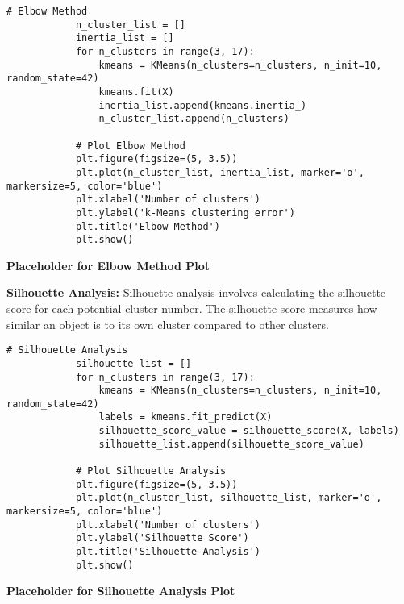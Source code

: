         \begin{lstlisting}[caption={Elbow Method for k-Means Clustering}, label={lst:elbow_method}]
            # Elbow Method
            n_cluster_list = []
            inertia_list = []
            for n_clusters in range(3, 17):
                kmeans = KMeans(n_clusters=n_clusters, n_init=10, random_state=42)
                kmeans.fit(X)
                inertia_list.append(kmeans.inertia_)
                n_cluster_list.append(n_clusters)
            
            # Plot Elbow Method
            plt.figure(figsize=(5, 3.5))
            plt.plot(n_cluster_list, inertia_list, marker='o', markersize=5, color='blue')
            plt.xlabel('Number of clusters')
            plt.ylabel('k-Means clustering error')
            plt.title('Elbow Method')
            plt.show()
        \end{lstlisting}

        \textbf{Placeholder for Elbow Method Plot}

        \textbf{Silhouette Analysis:} Silhouette analysis involves calculating the silhouette score for each potential cluster number. The silhouette score measures how similar an object is to its own cluster compared to other clusters.
        
        \vspace{0.5em}

        \begin{lstlisting}[caption={Silhouette Analysis for k-Means Clustering}, label={lst:silhouette_analysis}]
            # Silhouette Analysis
            silhouette_list = []
            for n_clusters in range(3, 17):
                kmeans = KMeans(n_clusters=n_clusters, n_init=10, random_state=42)
                labels = kmeans.fit_predict(X)
                silhouette_score_value = silhouette_score(X, labels)
                silhouette_list.append(silhouette_score_value)
            
            # Plot Silhouette Analysis
            plt.figure(figsize=(5, 3.5))
            plt.plot(n_cluster_list, silhouette_list, marker='o', markersize=5, color='blue')
            plt.xlabel('Number of clusters')
            plt.ylabel('Silhouette Score')
            plt.title('Silhouette Analysis')
            plt.show()
        \end{lstlisting}

        \textbf{Placeholder for Silhouette Analysis Plot}

